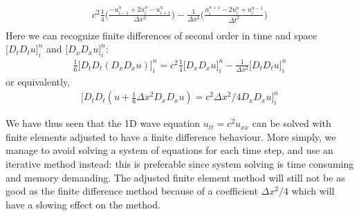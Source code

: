 \documentclass[a4paper,10pt]{article}
\begin{document}
\begin{description}
\begin{multline*}
 c^2 \frac{1}{4} \Big( \frac{- u_{i-1}^{n} + 2 u_{i}^{n} - u_{i+1}^{n}}{\Delta x^2} \Big) - \frac{1}{\Delta x^2} 
 \Big( \frac{ u_i^{n+1} - 2 u_i^n + u_i^{n-1}}{\Delta t^2} \Big)\\ 
\end{multline*}
Here we can recognize finite differences of second order in time and space $\lbrack D_t D_t u \rbrack_i^n$ and $\lbrack D_x D_x u \rbrack_i^n$:
\begin{align*}
\frac{1}{6} \lbrack D_t D_t (D_x D_x u) \rbrack_i^n = c^2 \frac{1}{4} \lbrack D_x D_x u \rbrack_i^n - 
\frac{1}{\Delta x^2} \lbrack D_t D_t u \rbrack_i^n
\end{align*}
or equivalently,
\begin{align*}
\lbrack D_t D_t (u + \frac{1}{6} \Delta x^2 D_x D_x u) = c^2 \Delta x^2 /4 D_x D_x u \rbrack_i^n
\end{align*}

We have thus seen that the 1D wave equation $u_{tt} = c^2 u_{xx}$ can be solved with finite elements adjusted to have a finite difference behaviour. 
More simply, we manage to avoid solving a system of equations for each time step, and use an iterative method instead: 
this is preferable since system solving is time consuming and memory demanding. \newline 
The adjusted finite element method will still not be as good as the finite difference method because of a coefficient $\Delta x^2 /4$ which will have
a slowing effect on the method.
\end{description}
\end{document}
